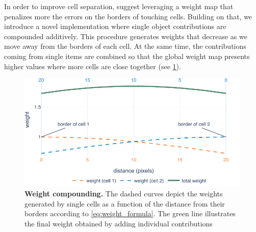 In order to improve cell separation,  suggest leveraging a weight map that penalizes more the errors on the borders of touching cells.
Building on that, we introduce a novel implementation where single object contributions are compounded additively.
This procedure generates weights that decrease as we move away from the borders of each cell.
At the same time, the contributions coming from single items are combined so that the global weight map presents higher values where more cells are close together (see \cref{fig:weight_calculation}).
%
%
\begin{figure}
    \centering
    \includegraphics[width=\textwidth]{figures/130_methods/weights_calculation.pdf}
    \caption{\textbf{Weight compounding.}
    The dashed curves depict the weights generated by single cells as a function of the distance from their borders according to \cref{eq:weight_formula}.
    The green line illustrates the final weight obtained by adding individual contributions
    }
    \label{fig:weight_calculation}
\end{figure}
